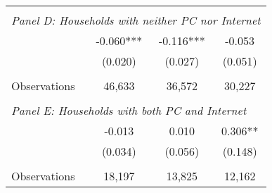 {\begin{tabular}{lccc}
&  &  &   \\
\multicolumn{4}{l}{\textit{Panel D: Households with neither PC nor Internet}} \\
\hspace{3mm}        &      -0.060***&      -0.116***&      -0.053   \\
                    &     (0.020)   &     (0.027)   &     (0.051)   \\
                    &               &               &               \\
\hspace{3mm}Observations&      46,633   &      36,572   &      30,227   \\
 
&  &  &   \\
\multicolumn{4}{l}{\textit{Panel E: Households with both PC and Internet}} \\
\hspace{3mm}        &      -0.013   &       0.010   &       0.306** \\
                    &     (0.034)   &     (0.056)   &     (0.148)   \\
                    &               &               &               \\
\hspace{3mm}Observations&      18,197   &      13,825   &      12,162   \\
 

\bottomrule
\end{tabular}
}
